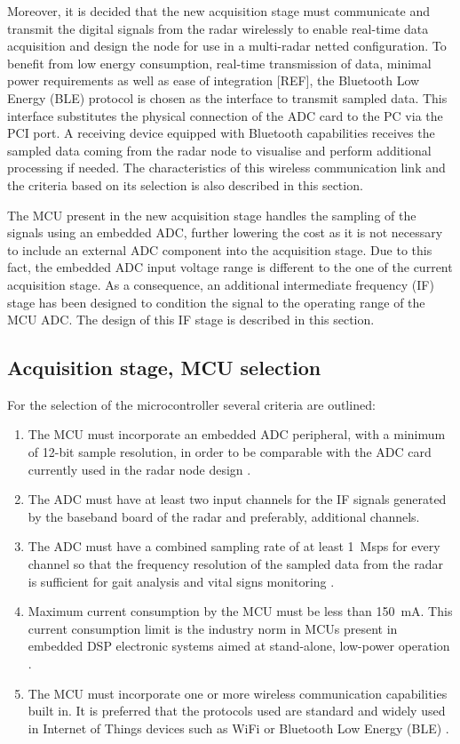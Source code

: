 Moreover, it is decided that the new acquisition stage must communicate and transmit the digital signals from the radar wirelessly to enable real-time data acquisition and design the node for use in a multi-radar netted configuration. To benefit from low energy consumption, real-time transmission of data, minimal power requirements as well as ease of integration [REF], the Bluetooth Low Energy (BLE) protocol is chosen as the interface to transmit sampled data. This interface substitutes the physical connection of the ADC card to the PC via the PCI port. A receiving device equipped with Bluetooth capabilities receives the sampled data coming from the radar node to visualise and perform additional processing if needed. The characteristics of this wireless communication link and the criteria based on its selection is also described in this section.

The MCU present in the new acquisition stage handles the sampling of the signals using an embedded ADC, further lowering the cost as it is not necessary to include an external ADC component into the acquisition stage. Due to this fact, the embedded ADC input voltage range is different to the one of the current acquisition stage. As a consequence, an additional intermediate frequency (IF) stage has been designed to condition the signal to the operating range of the MCU ADC. The design of this IF stage is described in this section.

\subsection{Acquisition stage, MCU selection}

For the selection of the microcontroller several criteria are outlined:
\begin{enumerate}
	\item The MCU must incorporate an embedded ADC peripheral, with a minimum of 12-bit sample resolution, in order to be comparable with the ADC card currently used in the radar node design \cite{Sardinero2022, ADLINKTechnologies2010}.
	\item The ADC must have at least two input channels for the IF signals generated by the baseband board of the radar and preferably, additional channels.
	\item The ADC must have a combined sampling rate of at least \SI{1}{Msps} for every channel so that the frequency resolution of the sampled data from the radar is sufficient for gait analysis and vital signs monitoring \cite{Antolinos2020, Sardinero2022}.
	\item Maximum current consumption by the MCU must be less than \SI{150}{\milli\ampere}. This current consumption limit is the industry norm in MCUs present in embedded DSP electronic systems aimed at stand-alone, low-power operation \cite{Benini2001}.
	\item The MCU must incorporate one or more wireless communication capabilities built in. It is preferred that the protocols used are standard and widely used in Internet of Things devices such as WiFi or Bluetooth Low Energy (BLE) \cite{AlSarawi2017}.
\end{enumerate}

